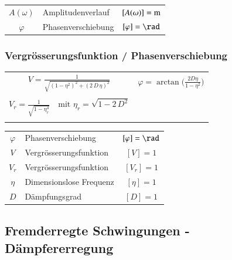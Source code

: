 \begin{tabular}{c l c}
$A(\omega)$ & Amplitudenverlauf & $[A(\omega)] = \mathrm{m}$ \\
$\varphi$ & Phasenverschiebung & $[\varphi] = \rad$
\end{tabular}




\subsubsection{Vergrösserungsfunktion / Phasenverschiebung}

\begin{tabular}{c c}
$ \boxed{ V = \frac{1}{\sqrt{(1- \eta^2)^2 + (2 \, D \, \eta)^2} } } $ & $ \boxed{ \varphi = \arctan \Big( \frac{2 D \eta}{1 - \eta^2}  \Big) } $ \\
\\
$ \boxed{ V_r = \frac{1}{\sqrt{ 1 - \eta_r^4} } \quad \text{mit } \eta_r = \sqrt{1 - 2 \, D^2}  } $ \\
\\
\end{tabular}


\begin{tabular}{c l c}
$\varphi$ & Phasenverschiebung & $[ \varphi] = \rad$ \\
$V$ & Vergrösserungsfunktion & $[V] = 1$ \\
$V_r$ & Vergrösserungsfunktion & $[V_r] = 1$ \\
$\eta$ & Dimensionslose Frequenz & $[\eta] = 1$  \\
$D$ & Dämpfungsgrad & $[D] = 1$ 
\end{tabular}




\subsection{Fremderregte Schwingungen - Dämpfererregung}

